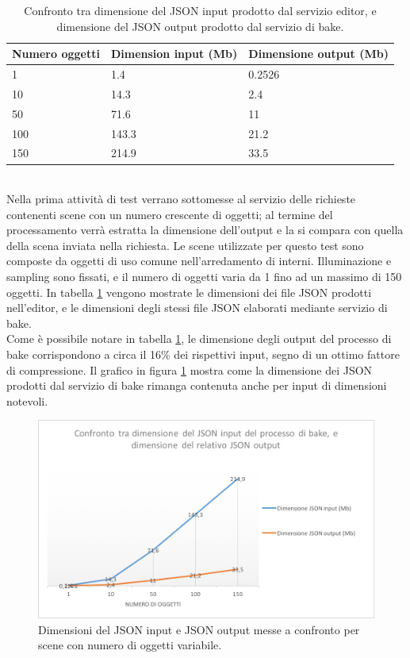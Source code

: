 \begin{table}[h]
\centering
\caption[Confronto dimensioni input-output]{Confronto tra dimensione del JSON input prodotto dal servizio editor, e dimensione del JSON output prodotto dal servizio di bake.}
\begin{tabular}{|l|l|l|}
\hline
\textbf{Numero oggetti} & \textbf{Dimension input (Mb)} & \textbf{Dimensione output (Mb)} \\ \hline
1 & 1.4 & 0.2526 \\ \hline
10 & 14.3 & 2.4 \\ \hline
50 & 71.6 & 11 \\ \hline
100 & 143.3 & 21.2 \\ \hline
150 & 214.9 & 33.5 \\ \hline
\end{tabular}
\label{table:dim_obj}
\end{table}
\\
Nella prima attività di test verrano sottomesse al servizio delle richieste contenenti scene con un numero crescente di oggetti; al termine del processamento verrà estratta la dimensione dell’output e la si compara con quella della scena inviata nella richiesta. 
Le scene utilizzate per questo test sono composte da oggetti di uso comune nell’arredamento di interni. 
Illuminazione e sampling sono fissati, e il numero di oggetti varia da 1 fino ad un massimo di 150 oggetti. In tabella \ref{table:dim_obj} vengono mostrate le dimensioni dei file JSON prodotti nell'editor, e le dimensioni degli stessi file JSON elaborati mediante servizio di bake.
\\
Come è possibile notare in tabella \ref{table:dim_obj}, le dimensione degli output del processo di bake corrispondono a circa il 16\% dei rispettivi input, segno di un ottimo fattore di compressione. Il grafico in figura \ref{fig:grafico5} mostra come la dimensione dei JSON prodotti dal servizio di bake rimanga contenuta anche per input di dimensioni notevoli.
\\
\begin{figure}[htb]
 \centering
 \includegraphics[width=0.8\linewidth]{images/chapter_prove_sperimentali/grafico5.png}\hfill
 \caption[Confronto dimensioni input-output]{Dimensioni del JSON input e JSON output messe a confronto per scene con numero di oggetti variabile.}
 \label{fig:grafico5}
\end{figure}
